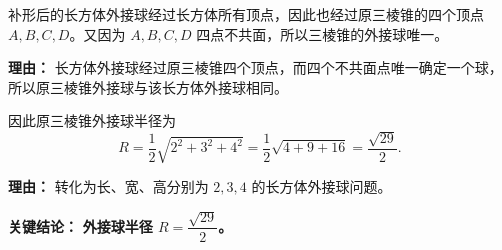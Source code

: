 \begin{examplebox}
\begin{description}[style=nextline, leftmargin=2.8em, labelsep=0.5em, itemsep=0.45em]
		\item[\textbf{第三步（说明外接球相同）：}]
		      补形后的长方体外接球经过长方体所有顶点，因此也经过原三棱锥的四个顶点 $A,B,C,D$。又因为 $A,B,C,D$ 四点不共面，所以三棱锥的外接球唯一。

		      \par\textbf{理由：}
		      长方体外接球经过原三棱锥四个顶点，而四个不共面点唯一确定一个球，所以原三棱锥外接球与该长方体外接球相同。

		\item[\textbf{第四步（代入公式）：}]
		      因此原三棱锥外接球半径为
		      \[
			      R
			      =
			      \frac{1}{2}\sqrt{2^2+3^2+4^2}
			      =
			      \frac{1}{2}\sqrt{4+9+16}
			      =
			      \frac{\sqrt{29}}{2}.
		      \]
		      \par\textbf{理由：}
		      转化为长、宽、高分别为 $2,3,4$ 的长方体外接球问题。
	\end{description}

	\textbf{\textcolor{CExample}{关键结论：}} \textbf{外接球半径 $R = \dfrac{\sqrt{29}}{2}$。}
\end{examplebox}